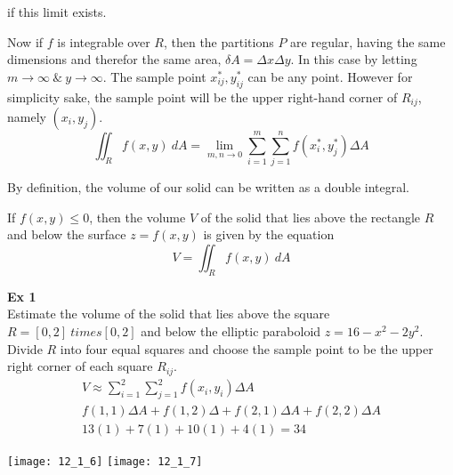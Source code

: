 \documentclass{article}
\begin{document}
  if this limit exists.

  Now if $ f $ is integrable over $ R $, then the partitions $ P $ are regular, having the same dimensions and therefor the same area, $ \delta A = \Delta x \Delta y $. In this case by letting $ m\to \infty ~\&~ y\to \infty $. The sample point $ x^{*}_{ij},y^{*}_{ij} $ can be any point. However for simplicity sake, the sample point will be the upper right-hand corner of $ R_{ij} $, namely $ (x_i,y_j) $.
  \[
    \iint_R f(x,y)~dA = \lim_{m,n \to 0}  \sum^{m}_{i=1} \sum^{n}_{j=1} f(x^{*}_{i},y^{*}_{j}) \Delta A_{}
  \]
  
 By definition, the volume of our solid can be written as a double integral. 

 If $ f(x,y) \le 0$, then the volume $ V $ of the solid that lies above the rectangle $ R $ and below the surface $ z=f(x,y) $ is given by the equation
 \[
   V = \iint_R f(x,y)~dA
 \]

 \textbf{Ex 1}\\
 Estimate the volume of the solid that lies above the square $ R = [0,2] \ times [0,2] $ and below the elliptic paraboloid $ z=16-x^{2}-2y^{2} $. Divide $ R $ into four equal squares and choose the sample point to be the upper right corner of each square $ R_{ij} $.
 \[
   \begin{gathered}
   V \approx \sum^{2}_{i=1}\sum^{2}_{j=1} f(x_i,y_i) \Delta A\\
   f(1,1) \Delta A + f(1,2) \Delta + f(2,1) \Delta A + f(2,2) \Delta A\\
   13(1)+7(1)+10(1)+4(1) = \boxed{34}
   \end{gathered}
 \]

 \begin{center}
   \texttt{[image: 12\_1\_6]} \qquad \texttt{[image: 12\_1\_7]}
 \end{center}
\end{document}
